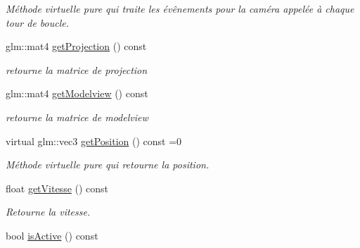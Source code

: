 \begin{DoxyCompactItemize}
\begin{DoxyCompactList}\small\item\em Méthode virtuelle pure qui traite les évênements pour la caméra appelée à chaque tour de boucle. \end{DoxyCompactList}\item 
\hypertarget{classAbstractCamera_a650255e1796dd50a2d95baa8c28fefae}{glm\-::mat4 \hyperlink{classAbstractCamera_a650255e1796dd50a2d95baa8c28fefae}{get\-Projection} () const }\label{classAbstractCamera_a650255e1796dd50a2d95baa8c28fefae}

\begin{DoxyCompactList}\small\item\em retourne la matrice de projection \end{DoxyCompactList}\item 
\hypertarget{classAbstractCamera_a31fa7a470de4ecd2437905ffd57cb40b}{glm\-::mat4 \hyperlink{classAbstractCamera_a31fa7a470de4ecd2437905ffd57cb40b}{get\-Modelview} () const }\label{classAbstractCamera_a31fa7a470de4ecd2437905ffd57cb40b}

\begin{DoxyCompactList}\small\item\em retourne la matrice de modelview \end{DoxyCompactList}\item 
\hypertarget{classAbstractCamera_ae6a61c6c50ffc278ad66f332e19e66a6}{virtual glm\-::vec3 \hyperlink{classAbstractCamera_ae6a61c6c50ffc278ad66f332e19e66a6}{get\-Position} () const =0}\label{classAbstractCamera_ae6a61c6c50ffc278ad66f332e19e66a6}

\begin{DoxyCompactList}\small\item\em Méthode virtuelle pure qui retourne la position. \end{DoxyCompactList}\item 
\hypertarget{classAbstractCamera_a1991c1773cda1eb142c9d127cf6e4107}{float \hyperlink{classAbstractCamera_a1991c1773cda1eb142c9d127cf6e4107}{get\-Vitesse} () const }\label{classAbstractCamera_a1991c1773cda1eb142c9d127cf6e4107}

\begin{DoxyCompactList}\small\item\em Retourne la vitesse. \end{DoxyCompactList}\item 
\hypertarget{classAbstractCamera_a625cd232811561751bd57493e2eadd20}{bool \hyperlink{classAbstractCamera_a625cd232811561751bd57493e2eadd20}{is\-Active} () const }\label{classAbstractCamera_a625cd232811561751bd57493e2eadd20}


\end{DoxyCompactItemize}
